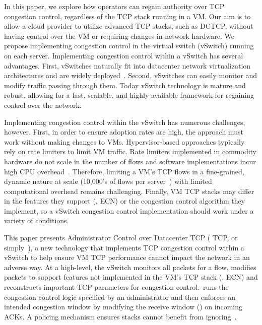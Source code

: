 In this paper, we explore how operators can regain authority over TCP congestion control, regardless of the TCP stack
running in a VM. Our aim is to allow a cloud provider to utilize advanced TCP stacks, such as DCTCP, without having
control over the VM or requiring changes in network hardware. We propose implementing congestion control in the virtual switch
(vSwitch) running on each server. Implementing congestion control within a vSwitch has several advantages. 
First, vSwitches naturally fit into datacenter network virtualization architectures and are widely
deployed~\cite{Pfaff2015ovs}. Second, vSwitches can easily monitor and modify traffic passing through them. 
Today vSwitch technology is mature and robust, allowing for a fast, scalable,
and highly-available framework for regaining control over the network. 


Implementing congestion control within the vSwitch has numerous challenges, however. First, in order to ensure adoption rates are high, the 
approach must work without making changes to VMs. 
Hypervisor-based approaches typically rely on rate limiters to limit VM traffic. Rate limiters implemented in
commodity hardware do not scale in the number of flows and software implementations incur high CPU overhead~\cite{radhakrishnan2014senic}. 
Therefore, limiting a VM's TCP flows in a fine-grained, dynamic nature
at scale (10,000's of flows per server~\cite{180302}) with limited computational overhead remains challenging. 
Finally, VM TCP stacks may differ in the features they support (\eg{}, ECN) or the congestion
control algorithm they implement, so a vSwitch congestion control implementation should work under a variety
of conditions. 

This paper presents Administrator Control over Datacenter TCP (\acdc{} TCP, or simply~\acdc{}), a new technology that implements 
TCP congestion control within a vSwitch to help ensure VM
TCP performance cannot impact the network in an adverse way. At a high-level, the vSwitch monitors all packets for a flow, modifies 
packets to support features not implemented in the VM's TCP stack (\eg{}, ECN) and reconstructs
important TCP parameters for congestion control.~\acdc runs the congestion control logic specified by an administrator and then enforces an intended
congestion window by modifying the receive window (\rwnd{}) on incoming ACKs. A policing
mechanism ensures stacks cannot benefit from ignoring~\rwnd{}.%

